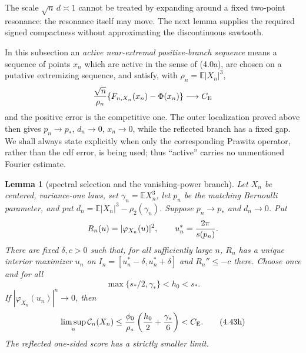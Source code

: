 \documentclass[11pt,a4paper]{article}
\numberwithin{equation}{section}
\newtheorem{lemma}[theorem]{Lemma}
\theoremstyle{definition}
\theoremstyle{remark}
\newcommand{\E}{\mathbb E}
\newcommand{\CE}{C_{\mathrm E}}
\begin{document}
The scale $\sqrt n\,d\asymp1$ cannot be treated by expanding around a
fixed two-point resonance: the resonance itself may move.  The next lemma
supplies the required signed compactness without approximating the
discontinuous sawtooth.

In this subsection an \emph{active near-extremal positive-branch
sequence} means a sequence of points \(x_n\) which are active in the sense
of (4.0a), are chosen on a putative extremizing sequence, and satisfy, with
\(\rho_n=\E|X_n|^3\),
\[
 {\sqrt n\over\rho_n}\{F_{n,X_n}(x_n)-\Phi(x_n)\}\longrightarrow\CE
\]
and the positive error is the competitive one.  The outer localization
proved above then gives $p_n\to p_*$, $d_n\to0$, $x_n\to0$, while the
reflected branch has a fixed gap.  We shall always state explicitly when
only the corresponding Prawitz operator, rather than the cdf error, is
being used; thus ``active'' carries no unmentioned Fourier estimate.

\begin{lemma}[spectral selection and the vanishing-power branch]
\label{orig:lem:spectral}
Let $X_n$ be centered, variance-one laws, set
$\gamma_n=\E X_n^3$, let $p_n$ be the matching Bernoulli parameter, and
put $d_n=\E|X_n|^3-\rho_2(\gamma_n)$.  Suppose
$p_n\to p_*$ and $d_n\to0$.  Put
\[
 R_n(u)=|\varphi_{X_n}(u)|^2,\qquad
 u_n^*={2\pi\over s(p_n)}.
\]
There are fixed $\delta,c>0$ such that, for all sufficiently large $n$,
$R_n$ has a unique interior maximizer $u_n$ on
$I_n=[u_n^*-\delta,u_n^*+\delta]$ and $R_n''\le-c$ there.
Choose once and for all
\[
 \max\{s_*/2,\gamma_*\}<h_0<s_*.
\]
If $|\varphi_{X_n}(u_n)|^n\to0$, then
\[
 \limsup_n\mathcal C_n(X_n)
 \le {\phi_0\over\rho_*}
       \left({h_0\over2}+{\gamma_*\over6}\right)<\CE. \tag{4.43h}
\]
The reflected one-sided score has a strictly smaller limit.
\end{lemma}
\end{document}
